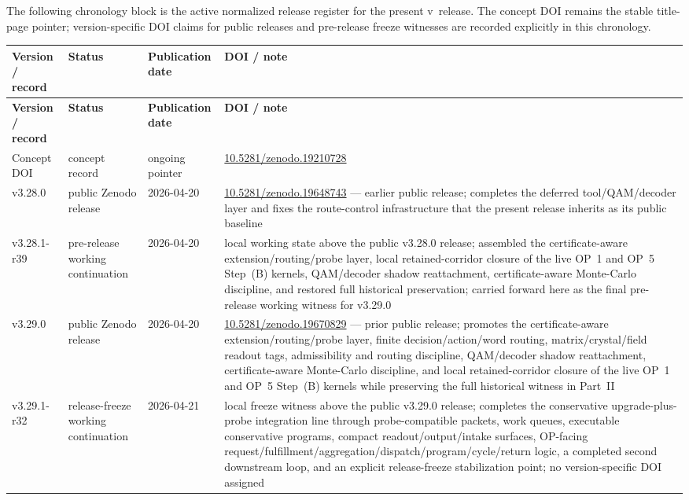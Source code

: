 The following chronology block is the active normalized release register for the present v\docversion\ release. The concept DOI remains the stable title-page pointer; version-specific DOI claims for public releases and pre-release freeze witnesses are recorded explicitly in this chronology.

{\small
\renewcommand{\arraystretch}{1.12}
\setlength{\LTleft}{0pt}
\setlength{\LTright}{0pt}
\begin{longtable}{|p{}|p{}|p{}|p{}|}
\hline
\textbf{Version / record} & \textbf{Status} & \textbf{Publication date} & \textbf{DOI / note} \\
\hline
\endfirsthead
\hline
\textbf{Version / record} & \textbf{Status} & \textbf{Publication date} & \textbf{DOI / note} \\
\hline
\endhead
Concept DOI & concept record & ongoing pointer & \href{https://doi.org/10.5281/zenodo.19210728}{10.5281/zenodo.19210728} \\
\hline
v3.28.0 & public Zenodo release & 2026-04-20 & \href{https://doi.org/10.5281/zenodo.19648743}{10.5281/zenodo.19648743} --- earlier public release; completes the deferred tool/QAM/decoder layer and fixes the route-control infrastructure that the present release inherits as its public baseline \\
\hline
v3.28.1-r39 & pre-release working continuation & 2026-04-20 & local working state above the public v3.28.0 release; assembled the certificate-aware extension/routing/probe layer, local retained-corridor closure of the live OP~1 and OP~5 Step~(B) kernels, QAM/decoder shadow reattachment, certificate-aware Monte-Carlo discipline, and restored full historical preservation; carried forward here as the final pre-release working witness for v3.29.0 \\
\hline
v3.29.0 & public Zenodo release & 2026-04-20 & \href{https://doi.org/10.5281/zenodo.19670829}{10.5281/zenodo.19670829} --- prior public release; promotes the certificate-aware extension/routing/probe layer, finite decision/action/word routing, matrix/crystal/field readout tags, admissibility and routing discipline, QAM/decoder shadow reattachment, certificate-aware Monte-Carlo discipline, and local retained-corridor closure of the live OP~1 and OP~5 Step~(B) kernels while preserving the full historical witness in Part~II \\
\hline
v3.29.1-r32 & release-freeze working continuation & 2026-04-21 & local freeze witness above the public v3.29.0 release; completes the conservative upgrade-plus-probe integration line through probe-compatible packets, work queues, executable conservative programs, compact readout/output/intake surfaces, OP-facing request/fulfillment/aggregation/dispatch/program/cycle/return logic, a completed second downstream loop, and an explicit release-freeze stabilization point; no version-specific DOI assigned \\

\end{longtable}}
